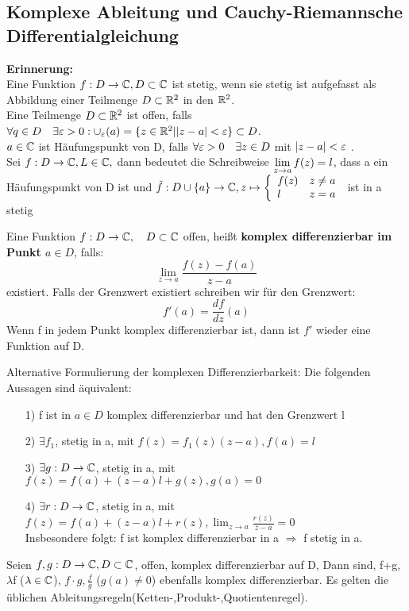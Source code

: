 \subsection{Komplexe Ableitung und Cauchy-Riemannsche Differentialgleichung}
\textbf{Erinnerung:}\\
Eine Funktion $f:D \to \mathbb{C}, D \subset \mathbb{C}$ ist stetig, wenn sie stetig ist aufgefasst als Abbildung einer Teilmenge $D\subset \mathbb{R}^2$ in den $\mathbb{R}^2$.\\
Eine Teilmenge $D\subset \mathbb{R}^2$ ist offen, falls $\forall q \in D \quad \exists \varepsilon > 0: \cup _\varepsilon(a) = \{z \in \mathbb{R}^2| |z-a| < \varepsilon\} \subset D$.\\
$a \in \mathbb{C}$ ist Häufungspunkt von D, falls $ \forall \varepsilon > 0 \quad \exists z \in D$ mit $|z-a| < \varepsilon$ .\\
Sei $f: D \to \mathbb{C}, L \in \mathbb{C},$ dann bedeutet die Schreibweise $\begin{displaystyle}
\lim_{z \to a} f(z)=l 
\end{displaystyle}$, dass a ein Häufungspunkt von D ist und $\tilde{f} : D \cup \{a\} \to \mathbb{C}, z\mapsto \left\{
\begin{array}{ll}
	f(z)&z\neq a\\
	l & z=a 
\end{array}\right. $ ist in a stetig


\begin{definition}
Eine Funktion $f: D \to \mathbb{C}, \quad D \subset \mathbb{C}$ offen, heißt \textbf{komplex differenzierbar im Punkt $a\in D$}, falls:
\[
\lim_{z \to a} \frac{f(z) -f(a)}{z-a}
\]
existiert. Falls der Grenzwert existiert schreiben wir für den Grenzwert:
\[
f\prime(a) = \frac{df}{dz}(a)
\]
Wenn f in jedem Punkt komplex differenzierbar ist, dann ist $f\prime$ wieder eine Funktion auf D.
\end{definition}

\begin{bemerkung}
Alternative Formulierung der komplexen Differenzierbarkeit:
Die folgenden Aussagen sind äquivalent:
\begin{itemize}
	\item[1)] 
	f ist in $a\in D$ komplex differenzierbar und hat den Grenzwert l
	\item[2)]
	$\exists f_1$, stetig in a, mit $f(z) = f_1(z)(z-a), f(a) = l$
	\item[3)]
	$\exists g: D \to \mathbb{C}$, stetig in a, mit $f(z) = f(a) + (z-a)l+ g(z), g(a)=0$
	\item[4)]
	$\exists r: D\to \mathbb{C}$, stetig in a, mit $f(z) = f(a) +(z-a)l + r(z), \lim_{z \to a}\frac{r(z)}{z-a}= 0$\\
	Insbesondere folgt: f ist komplex differenzierbar in a $\Rightarrow$ f stetig in a.
\end{itemize}
\end{bemerkung}

\begin{satz}
Seien $f,g: D \to \mathbb{C}, D\subset \mathbb{C}$, offen, komplex differenzierbar auf D, Dann sind, f+g, $\lambda$f ($\lambda \in \mathbb{C}$), $f \cdot g, \frac{f}{g}$ ($g(a) \neq 0$) ebenfalls komplex differenzierbar. Es gelten die üblichen Ableitungsregeln(Ketten-,Produkt-,Quotientenregel).
\end{satz}